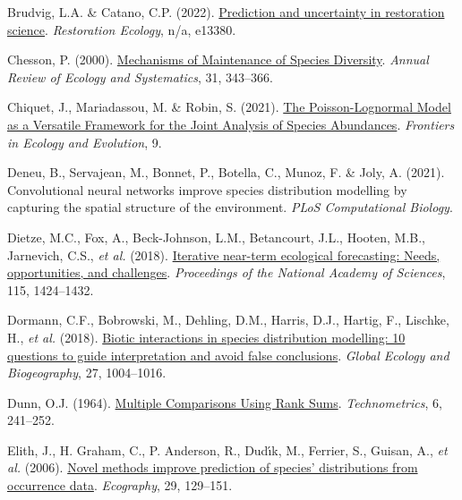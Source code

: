 \documentclass[9pt,biorxiv,doublespacing,lineno,endfloat]{lapreprint}
\newlength{\cslhangindent}
\newlength{\cslentryspacingunit} %
\newenvironment{CSLReferences}[2] %
 {%
  \setlength{\parindent}{0pt}
  \ifodd #1
  \let\oldpar\par
  \def\par{\hangindent=\cslhangindent\oldpar}
  \fi
  \setlength{\parskip}{#2\cslentryspacingunit}
 }%
 {}
\begin{document}
\begin{CSLReferences}{1}{0}
\leavevmode{}%
Brudvig, L.A. \& Catano, C.P. (2022).
\href{https://doi.org/10.1111/rec.13380}{Prediction and uncertainty in
restoration science}. \emph{Restoration Ecology}, n/a, e13380.

\leavevmode{}%
Chesson, P. (2000).
\href{https://doi.org/10.1146/annurev.ecolsys.31.1.343}{Mechanisms of
Maintenance of Species Diversity}. \emph{Annual Review of Ecology and
Systematics}, 31, 343--366.

\leavevmode{}%
Chiquet, J., Mariadassou, M. \& Robin, S. (2021).
\href{https://doi.org/10.3389/fevo.2021.588292}{The Poisson-Lognormal
Model as a Versatile Framework for the Joint Analysis of Species
Abundances}. \emph{Frontiers in Ecology and Evolution}, 9.

\leavevmode{}%
Deneu, B., Servajean, M., Bonnet, P., Botella, C., Munoz, F. \& Joly, A.
(2021). Convolutional neural networks improve species distribution
modelling by capturing the spatial structure of the environment.
\emph{PLoS Computational Biology}.

\leavevmode{}%
Dietze, M.C., Fox, A., Beck-Johnson, L.M., Betancourt, J.L., Hooten,
M.B., Jarnevich, C.S., \emph{et al.} (2018).
\href{https://doi.org/10.1073/pnas.1710231115}{Iterative near-term
ecological forecasting: Needs, opportunities, and challenges}.
\emph{Proceedings of the National Academy of Sciences}, 115, 1424--1432.

\leavevmode{}%
Dormann, C.F., Bobrowski, M., Dehling, D.M., Harris, D.J., Hartig, F.,
Lischke, H., \emph{et al.} (2018).
\href{https://doi.org/10.1111/geb.12759}{Biotic interactions in species
distribution modelling: 10 questions to guide interpretation and avoid
false conclusions}. \emph{Global Ecology and Biogeography}, 27,
1004--1016.

\leavevmode{}%
Dunn, O.J. (1964).
\href{https://doi.org/10.1080/00401706.1964.10490181}{Multiple
Comparisons Using Rank Sums}. \emph{Technometrics}, 6, 241--252.

\leavevmode{}%
Elith, J., H. Graham, C., P. Anderson, R., Dudı́k, M., Ferrier, S.,
Guisan, A., \emph{et al.} (2006).
\href{https://doi.org/10.1111/j.2006.0906-7590.04596.x}{Novel methods
improve prediction of species' distributions from occurrence data}.
\emph{Ecography}, 29, 129--151.


\end{CSLReferences}
\end{document}
